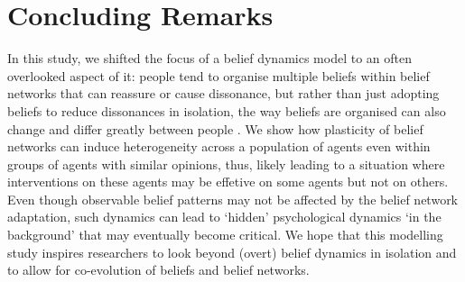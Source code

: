 \section*{Concluding Remarks}

In this study, we shifted the focus of a belief dynamics model to an often overlooked aspect of it: people tend to organise multiple beliefs within belief networks that can reassure or cause dissonance, but rather than just adopting beliefs to reduce dissonances in isolation, the way beliefs are organised can also change \cite{fishmanChangeWeCan2022} and differ greatly between people \cite{baldassarriNeitherIdeologuesAgnostics2014, ludersAttitudeNetworksIntergroup2024, goldbergSocialContagionAssociative2018}. We show how plasticity of belief networks can induce heterogeneity across a population of agents even within groups of agents with similar opinions, thus, likely leading to a situation where interventions on these agents may be effetive on some agents but not on others. Even though observable belief patterns may not be affected by the belief network adaptation, such dynamics can lead to `hidden' psychological dynamics `in the background' that may eventually become critical. We hope that this modelling study inspires researchers to look beyond (overt) belief dynamics in isolation and to allow for co-evolution of beliefs and belief networks.   

